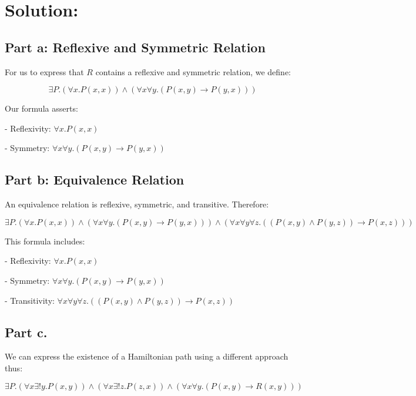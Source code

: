 \documentclass{article}
\begin{document}
\section*{Solution:}

 \subsection*{Part a:  Reflexive and Symmetric Relation} 
 For us to express that \( R \) contains a reflexive and symmetric relation, we define:

\[
\exists P. (\forall x. P(x, x)) \land (\forall x \forall y. (P(x, y) \rightarrow P(y, x)))
\]

Our formula asserts:

\vspace{1em}
- Reflexivity: \( \forall x. P(x, x) \)

    \vspace{1em}
- Symmetry: \( \forall x \forall y. (P(x, y) \rightarrow P(y, x)) \)

    \newpage

 \subsection*{Part b: Equivalence Relation} 
 An equivalence relation is reflexive, symmetric, and transitive. Therefore:

\[
\exists P. (\forall x. P(x, x)) \land (\forall x \forall y. (P(x, y) \rightarrow P(y, x))) \land (\forall x \forall y \forall z. ((P(x, y) \land P(y, z)) \rightarrow P(x, z)))
\]

This formula includes:

    \vspace{1em}
- Reflexivity: \( \forall x. P(x, x) \)

    \vspace{1em}
- Symmetry: \( \forall x \forall y. (P(x, y) \rightarrow P(y, x)) \)

    \vspace{1em}
- Transitivity: \( \forall x \forall y \forall z. ((P(x, y) \land P(y, z)) \rightarrow P(x, z)) \)

 \newpage

 \subsection*{Part c.} 
 We can express the existence of a Hamiltonian path using a different approach thus:

    \vspace{1em}
\[
\exists P. \left( \forall x \exists! y. P(x, y) \right) \land \left( \forall x \exists! z. P(z, x) \right) \land \left( \forall x \forall y. (P(x, y) \rightarrow R(x, y)) \right)
\]
 
\end{document}
